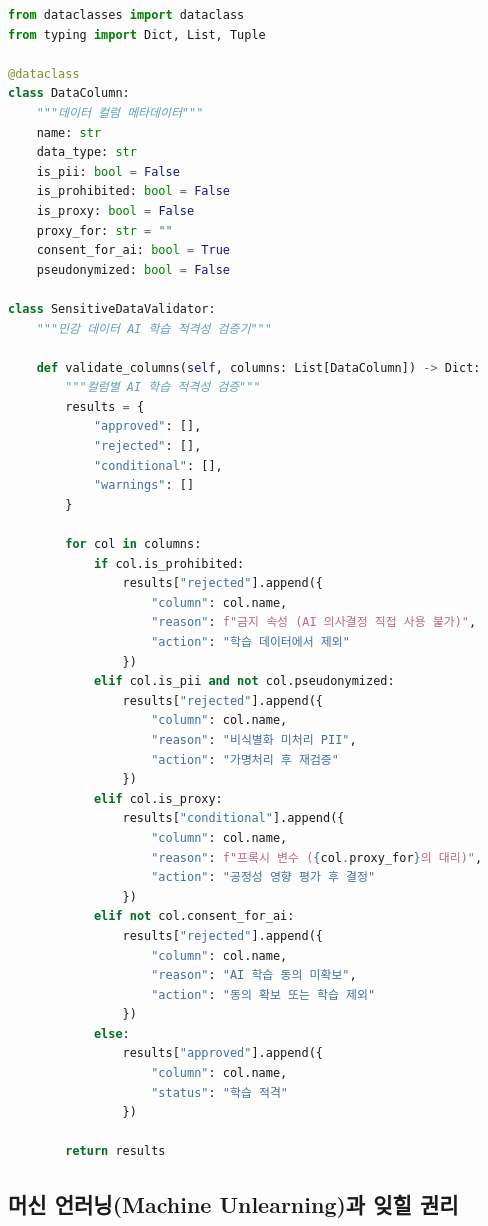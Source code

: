 \begin{lstlisting}[language=Python, caption={민감 데이터 AI 학습 적격성 검증기}, label={lst:sensitive_data_check}]
from dataclasses import dataclass
from typing import Dict, List, Tuple

@dataclass
class DataColumn:
    """데이터 컬럼 메타데이터"""
    name: str
    data_type: str
    is_pii: bool = False
    is_prohibited: bool = False
    is_proxy: bool = False
    proxy_for: str = ""
    consent_for_ai: bool = True
    pseudonymized: bool = False

class SensitiveDataValidator:
    """민감 데이터 AI 학습 적격성 검증기"""

    def validate_columns(self, columns: List[DataColumn]) -> Dict:
        """컬럼별 AI 학습 적격성 검증"""
        results = {
            "approved": [],
            "rejected": [],
            "conditional": [],
            "warnings": []
        }

        for col in columns:
            if col.is_prohibited:
                results["rejected"].append({
                    "column": col.name,
                    "reason": f"금지 속성 (AI 의사결정 직접 사용 불가)",
                    "action": "학습 데이터에서 제외"
                })
            elif col.is_pii and not col.pseudonymized:
                results["rejected"].append({
                    "column": col.name,
                    "reason": "비식별화 미처리 PII",
                    "action": "가명처리 후 재검증"
                })
            elif col.is_proxy:
                results["conditional"].append({
                    "column": col.name,
                    "reason": f"프록시 변수 ({col.proxy_for}의 대리)",
                    "action": "공정성 영향 평가 후 결정"
                })
            elif not col.consent_for_ai:
                results["rejected"].append({
                    "column": col.name,
                    "reason": "AI 학습 동의 미확보",
                    "action": "동의 확보 또는 학습 제외"
                })
            else:
                results["approved"].append({
                    "column": col.name,
                    "status": "학습 적격"
                })

        return results
\end{lstlisting}


\subsection{머신 언러닝(Machine Unlearning)과 잊힐 권리}
\label{sec:9.3.3}

